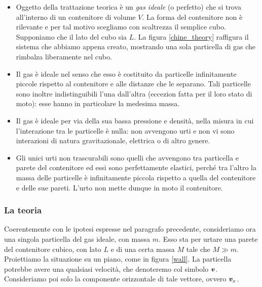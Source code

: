 \begin{itemize}
    \item Oggetto della trattazione teorica è un \textit{gas ideale}
    (o perfetto) che si trova all'interno di un contenitore di
    volume $V$. La forma del contenitore non è rilevante e per tal motivo
    scegliamo con scaltrezza il semplice cubo. Supponiamo che il
    lato del cubo sia $L$. La figura \ref{chine_theory} raffigura
    il sistema che abbiamo appena creato, mostrando una sola particella
    di gas che rimbalza liberamente nel cubo.

    \item Il gas è ideale nel senso che esso è costituito da particelle
    infinitamente piccole rispetto al contenitore e alle distanze che
    le separano. Tali particelle sono inoltre indistinguibili l'una
    dall'altra (eccezion fatta per il loro stato di moto): esse hanno
    in particolare la medesima massa.

    \item Il gas è ideale per via della sua bassa pressione e densità,
    nella misura in cui l'interazione tra le particelle è nulla: non
    avvengono urti e non vi sono interazioni di natura gravitazionale,
    elettrica o di altro genere.

    \item Gli unici urti non trascurabili sono quelli che avvengono
    tra particella e parete del contenitore ed essi sono perfettamente
    elastici, perché tra l'altro la massa delle particelle è infinitamente
    piccola rispetto a quella del contenitore e delle sue pareti. L'urto
    non mette dunque in moto il contenitore.
\end{itemize}

\subsubsection*{La teoria}
Coerentemente con le ipotesi espresse nel paragrafo precedente,
consideriamo ora una singola particella del gas ideale, con massa
$m$. Esso sta per urtare una parete del contenitore cubico, con
lato $L$ e di una certa massa $M$ tale che $M \gg m$. Proiettiamo la situazione su un piano, come in figura
\ref{wall}. La particella potrebbe avere una qualsiasi velocità,
che denoteremo col simbolo $\textbf{\textit{v}}$. Consideriamo poi solo la componente
orizzontale di tale vettore, ovvero $\textbf{\textit{v}}_x$.

